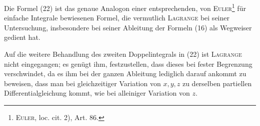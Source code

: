 Die Formel (22) ist das genaue Analogon einer entsprechenden, von \textsc{Euler}\footnote{\textsc{Euler}, loc. cit. 2), Art. 86.}
für einfache Integrale bewiesenen Formel, die vermutlich \textsc{Lagrange} bei seiner
Untersuchung, insbesondere bei seiner Ableitung der Formeln (16) als Wegweiser
gedient hat.

Auf die weitere Behandlung des zweiten Doppelintegrals in (22) ist \textsc{Lagrange}
nicht eingegangen; es genügt ihm, festzustellen, dass dieses bei fester
Begrenzung verschwindet, da es ihm bei der ganzen Ableitung lediglich darauf
ankommt zu beweisen, dass man bei gleichzeitiger Variation von $x,y,z$ zu
derselben partiellen Differentialgleichung kommt, wie bei alleiniger Variation
von $z$.
\par\clearpage\endgroup
